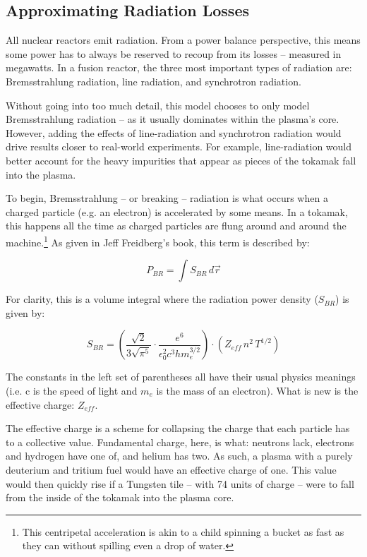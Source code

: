 \subsection{Approximating Radiation Losses}

All nuclear reactors emit radiation. From a power balance perspective, this means some power has to always be reserved to recoup from its losses -- measured in megawatts. In a fusion reactor, the three most important types of radiation are: Bremsstrahlung radiation, line radiation, and synchrotron radiation. 

Without going into too much detail, this model chooses to only model Bremsstrahlung radiation -- as it usually dominates within the plasma's core. However, adding the effects of line-radiation and synchrotron radiation would drive results closer to real-world experiments. For example, line-radiation would better account for the heavy impurities that appear as pieces of the tokamak fall into the plasma.

To begin, Bremsstrahlung -- or breaking -- radiation is what occurs when a charged particle (e.g. an electron) is accelerated by some means. In a tokamak, this happens all the time as charged particles are flung around and around the machine.\footnote{This centripetal acceleration is akin to a child spinning a bucket as fast as they can without spilling even a drop of water.} As given in Jeff Freidberg's book, this term is described by:

\begin{equation}
	P_{BR} = \int S_{BR} \, d \vec{r}
\end{equation}

For clarity, this is a volume integral where the radiation power density ($S_{BR}$) is given by:

\begin{equation}
	S_{BR} = \left( \frac{\sqrt{2}}{3 \sqrt{\pi^5}} \cdot \frac{e^6}{\epsilon_0^2 c^3 h m_e^{3/2}} \right) \cdot \left( Z_{eff} \, n^2 \, T^{1/2} \right)
\end{equation}

The constants in the left set of parentheses all have their usual physics meanings (i.e. c is the speed of light and $m_e$ is the mass of an electron). What is new is the effective charge: $Z_{eff}$.

The effective charge is a scheme for collapsing the charge that each particle has to a collective value. Fundamental charge, here, is what: neutrons lack, electrons and hydrogen have one of, and helium has two. As such, a plasma with a purely deuterium and tritium fuel would have an effective charge of one. This value would then quickly rise if a Tungsten tile -- with 74 units of charge -- were to fall from the inside of the tokamak into the plasma core.

